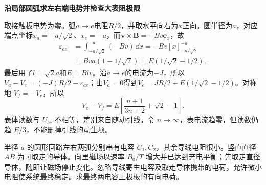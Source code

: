 \begin{solution}
\par\medskip{}\noindent\textbf{沿局部圆弧求左右端电势并检查大表阻极限}\par\nobreak
取接触板电势为零。弧$a\to e$电阻$R/2$，并取水平向右为$x$正向。圆半径为$a$，对应端点坐标$x_a=-a/\sqrt2$、$x_e=-a$，而$\bm v\times\bm B=-Bv\bm e_x$，故
\begin{align*}
\varepsilon_{ae}
&=\int_{-a/\sqrt2}^{-a}(-Bv)\,\dd x
=-Bv[x]_{-a/\sqrt2}^{-a}\\
&=Bva(1-1/\sqrt2)
=E(1/\sqrt2-1/2),
\end{align*}
最后用了$l=\sqrt2a$和$E=Blv$。沿$a\to e$的电流为$-J$，所以$V_a-V_e=(-J)R/2-\varepsilon_{ae}$；由$V_a=0$得到$V_e=JR/2+E(1/\sqrt2-1/2)$。对称地 $V_f=-V_e$，所以
\[V_e-V_f=E\left[\frac{n+1}{3n+2}+\sqrt2-1\right].\]
表体读数与 $U_{bc}$ 不相等，差别来自随动引线。令 $n\to\infty$，表电流趋零，但读数仍趋 $E/3$，不能删掉引线的动生项。\end{solution}
\begin{question}\begin{example}[取走直径导体后的电荷分配]\label{em2:example:5}
半径 $a$ 的圆形回路左右两弧分别串有电容 $C_1,C_2$，其余导线电阻很小。竖直直径 $AB$ 为可取走的导体。向里磁场以速率 $B_0/T$ 增大并已达到充电平衡；先取走直径导体，随即让磁场停止变化。忽略导线寄生电容及取走导体携带的电荷，允许微小电阻使系统最终稳定。求最终两电容上极板的有向电荷。
\end{example}
\end{question}
